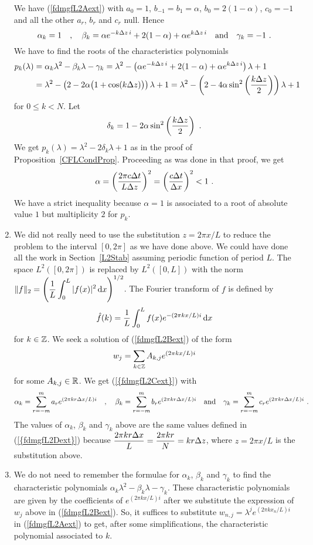 \begin{rmkList}
\begin{enumerate}
We have (\ref{fdmgfL2Aext}) with $a_0 = 1$, $b_{-1} = b_1 = \alpha$,
$b_0 = 2(1-\alpha)$, $c_0 = -1$ and all the other $a_r$, $b_r$ and
$c_r$ null.  Hence
\[
\alpha_k = 1 \quad , \quad
\beta_k = \alpha e^{-k\Delta{z}\, i}
+ 2(1-\alpha) + \alpha e^{k \Delta{z} \, i} \quad \text{and}
\quad \gamma_k = -1 \ .
\]
We have to find the roots of the characteristics polynomials
\begin{align}
p_k(\lambda) &= \alpha_k \lambda^2 - \beta_k \lambda  - \gamma_k
= \lambda^2 - \left( \alpha e^{-k\Delta{z} \, i}
+ 2(1-\alpha) + \alpha e^{k \Delta{z} \, i} \right) \lambda + 1 \nonumber \\
&= \lambda^2 -\left(2 - 2\alpha\big(1+\cos( k \Delta{z})\big) \right) \lambda + 1
= \lambda^2 - \left( 2 -4 \alpha \sin^2\left( \frac{k \Delta{z}}{2}
  \right) \right)\lambda + 1 \label{fdmgfL2Cext}
\end{align}
for $0 \leq k < N$.  Let
\[
  \delta_k = 1 - 2\alpha \sin^2\left( \frac{k \Delta{z}}{2} \right) \ .
\]
We get $p_k(\lambda) = \lambda^2 - 2\delta_k \lambda  +1$ as in the
proof of Proposition~\ref{CFLCondProp}.  Proceeding as was done in
that proof, we get
\[
  \alpha = \left(\frac{2\pi c \Delta{t}}{L \Delta{z}}\right)^2
  = \left( \frac{c \Delta{t}}{\Delta{x}}\right)^2 < 1 \ .
\]
We have a strict inequality because $\alpha = 1$ is associated to a
root of absolute value $1$ but multiplicity $2$ for $p_k$.
\item  We did not really need to use the substitution $z = 2\pi x/L$
to reduce the problem to the interval $[0,2\pi]$ as we have done
above.   We could have done all the work in Section~\ref{L2Stab}
assuming periodic function of period $L$.  The space
$L^2([0,2\pi])$ is replaced by $L^2([0,L])$ with the norm
$\displaystyle \|f\|_2 =
\left( \frac{1}{L} \int_0^L |f(x)|^2 \,\mathrm{d}x \right)^{1/2}$.  The Fourier
transform of $f$ is defined by
\[
\hat{f}(k) =
\frac{1}{L} \int_0^L f(x) e^{-(2\pi k x/L)i} \,\mathrm{d}x
\]
for $k \in \mathbb{Z}$.  We seek a solution of (\ref{fdmgfL2Bext}) of the form
\[
  w_j = \sum_{k\in \mathbb{Z}} A_{k,j} e^{(2\pi k x/L) i}
\]
for some $A_{k,j} \in \mathbb{R}$.   We get (\ref{{fdmgfL2Cext}}) with
\[
\alpha_k = \sum_{r=-m}^m a_r e^{(2\pi k r \Delta{x}/L) i} \quad , \quad
\beta_k = \sum_{r=-m}^m b_r  e^{(2\pi k r \Delta{x}/L) i} \quad \text{and} \quad
\gamma_k = \sum_{r=-m}^m c_r  e^{(2\pi k r \Delta{x}/L) i} \ .
\]
The values of $\alpha_k$, $\beta_k$ and $\gamma_k$ above are the
same values defined in (\ref{{fdmgfL2Dext}}) because
$\displaystyle \frac{2\pi k r \Delta{x}}{L} = 
\frac{2\pi k r}{N} = k r \Delta{z}$, where $z=2\pi x /L$ is the
substitution above.
\item We do not need to remember the formulae for $\alpha_k$, $\beta_k$
and $\gamma_k$ to find the characteristic polynomials
$\alpha_k \lambda^2 - \beta_k \lambda - \gamma_k$.  These
characteristic polynomials are given by the coefficients of
$\displaystyle e^{(2\pi k x/L) i}$ after we substitute the expression
of $w_j$ above in (\ref{fdmgfL2Bext}).  So, it suffices to substitute
$\displaystyle w_{n,j} = \lambda^j e^{(2\pi k x_n/L) i}$ in
(\ref{fdmgfL2Aext}) to get, after some simplifications, the
characteristic polynomial associated to $k$.


\end{enumerate}
\end{rmkList}
